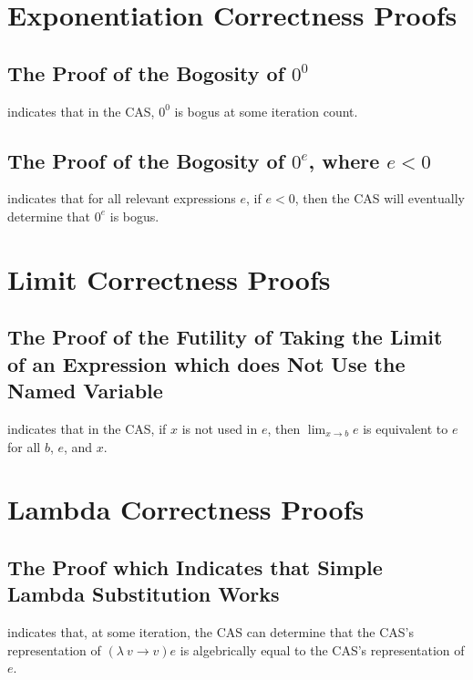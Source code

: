 \documentclass{report}
\begin{document}
\section{Exponentiation Correctness Proofs}

\subsection{The Proof of the Bogosity of \(0^0\)}
  indicates that in the  CAS, \(0^0\) is bogus at some iteration count.

\subsection{The Proof of the Bogosity of \(0^e\), where \(e < 0\)}
  indicates that for all relevant expressions \(e\), if \(e < 0\), then the CAS will eventually determine that \(0^e\) is bogus.

\section{Limit Correctness Proofs}

\subsection{The Proof of the Futility of Taking the Limit of an Expression which does Not Use the Named Variable}
  indicates that in the  CAS, if \(x\) is not used in \(e\), then \(\lim_{x \rightarrow b} e\) is equivalent to \(e\) for all \(b\), \(e\), and \(x\).

\section{Lambda Correctness Proofs}

\subsection{The Proof which Indicates that Simple Lambda Substitution Works}
  indicates that, at some iteration, the  CAS can determine that the  CAS's representation of \(\left(\lambda\ v \rightarrow v\right) e\) is algebrically equal to the  CAS's representation of \(e\).
\end{document}
